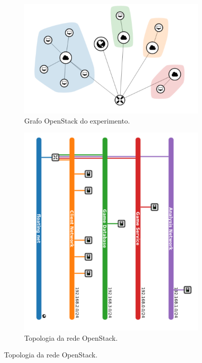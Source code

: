 \begin{figure}[htb!]
    \caption{A figure with two subfigures}
    \centering
    \begin{subfigure}{0.5\textwidth}
      \centering
      \includegraphics[width=.8\textwidth]{img/cap5/topology_graph.png}
      \caption{Grafo OpenStack do experimento.}
      \label{fig:topologia_a}
    \end{subfigure}%
    \begin{subfigure}{0.5\textwidth}
      \centering
      \includegraphics[width=.8\textwidth]{img/cap5/topology.png}
      \caption{Topologia da rede OpenStack.}
      \label{fig:topologia_b}
    \end{subfigure}
    \label{fig:topologia}
\end{figure}


